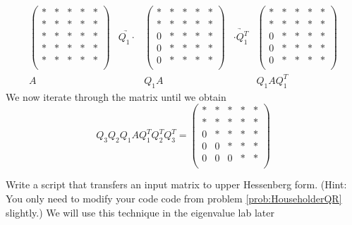 \[
\begin{array}{ccccc}
\begin{pmatrix}
* & * & * & * & *\\
* & * & * & * & *\\
* & * & * & * & *\\
* & * & * & * & *\\
* & * & * & * & *\\
\end{pmatrix} 
&\underrightarrow{Q_1 \cdot }&
\begin{pmatrix}
* & * & * & * & *\\
* & * & * & * & *\\
0 & * & * & * & *\\
0 & * & * & * & *\\
0 & * & * & * & *\\
\end{pmatrix} 
&\underrightarrow{\cdot Q_1^T }&
\begin{pmatrix}
* & * & * & * & *\\
* & * & * & * & *\\
0 & * & * & * & *\\
0 & * & * & * & *\\
0 & * & * & * & *\\
\end{pmatrix}
\\ 
A & & Q_1A & & Q_1 A Q_1^T
  \end{array}
\]
We now iterate through the matrix until we obtain
\begin{equation*}
Q_3 Q_2 Q_1 A Q_1^T Q_2 ^T Q_3^T = 
\begin{pmatrix}
* & * & * & * & *\\
* & * & * & * & *\\
0 & * & * & * & *\\
0 & 0 & * & * & *\\
0 & 0 & 0 & * & *\\
\end{pmatrix}
\end{equation*}

\begin{problem}
Write a script that transfers an input matrix to upper Hessenberg form.
(Hint: You only need to modify your code code from problem \ref{prob:HouseholderQR} slightly.)
We will use this technique in the eigenvalue lab later
\end{problem}

